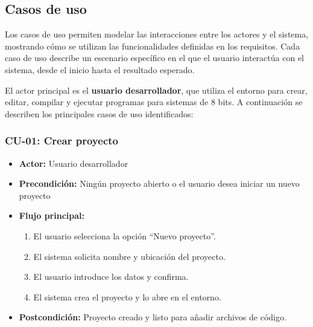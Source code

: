 \documentclass[../../main.tex]{subfiles}
\begin{document}
\clearpage

\subsection{Casos de uso}

Los casos de uso permiten modelar las interacciones entre los actores y el sistema, mostrando cómo se utilizan las funcionalidades definidas en los requisitos. Cada caso de uso describe un escenario específico en el que el usuario interactúa con el sistema, desde el inicio hasta el resultado esperado.

El actor principal es el \textbf{usuario desarrollador}, que utiliza el entorno para crear, editar, compilar y ejecutar programas para sistemas de 8 bits. A continuación se describen los principales casos de uso identificados:

\subsubsection*{CU-01: Crear proyecto}
\begin{itemize}
    \item \textbf{Actor:} Usuario desarrollador
    \item \textbf{Precondición:} Ningún proyecto abierto o el usuario desea iniciar un nuevo proyecto
    \item \textbf{Flujo principal:}
        \begin{enumerate}
            \item El usuario selecciona la opción ``Nuevo proyecto''.
            \item El sistema solicita nombre y ubicación del proyecto.
            \item El usuario introduce los datos y confirma.
            \item El sistema crea el proyecto y lo abre en el entorno.
        \end{enumerate}
    \item \textbf{Postcondición:} Proyecto creado y listo para añadir archivos de código.
\end{itemize}
\end{document}
